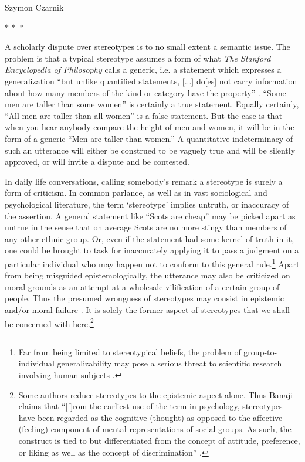 \begin{artengenv}{Szymon Czarnik}
\begin{center}
$ {\ast}\,{\ast}\,{\ast} $
\end{center}


A scholarly dispute over stereotypes is to no small extent a semantic issue. The problem is that a typical stereotype assumes a form of what \textit{The Stanford Encyclopedia of Philosophy} calls a generic, i.e. a statement which expresses a generalization ``but unlike quantified statements, [...] do[es] not carry information about how many members of the kind or category have the property''
\parencite[][]{leslie_generic_2016}. %
 ``Some men are taller than some women'' is certainly a true statement. Equally certainly, ``All men are taller than all women'' is a false statement. But the case is that when you hear anybody compare the height of men and women, it will be in the form of a generic ``Men are taller than women.'' A quantitative indeterminacy of such an utterance will either be construed to be vaguely true and will be silently approved, or will invite a dispute and be contested.

\enlargethispage{.7\baselineskip}
In daily life conversations, calling somebody's remark a stereotype is surely a form of criticism. In common parlance, as well as in vast sociological and psychological literature, the term ‘stereotype' implies untruth, or inaccuracy of the assertion. A general statement like ``Scots are cheap'' may be picked apart as untrue in the sense that on average Scots are no more stingy than members of any other ethnic group. Or, even if the statement had some kernel of truth in it, one could be brought to task for inaccurately applying it to pass a judgment on a particular individual who may happen not to conform to this general rule.\footnote{Far from being limited to stereotypical beliefs, the problem of group-to-individual generalizability may pose a serious threat to scientific research involving human subjects
\parencite[][]{fisher_lack_2018}.%
} Apart from being misguided epistemologically, the utterance may also be criticized on moral grounds as an attempt at a wholesale vilification of a certain group of people. Thus the presumed wrongness of stereotypes may consist in epistemic and/or moral failure 
\parencite[][]{beeghly_seeing_2014}. %
 It is solely the former aspect of stereotypes that we shall be concerned with here.\footnote{Some authors reduce stereotypes to the epistemic aspect alone. Thus Banaji claims that ``[f]rom the earliest use of the term in psychology, stereotypes have been regarded as the cognitive (thought) as opposed to the affective (feeling) component of mental representations of social groups. As such, the construct is tied to but differentiated from the concept of attitude, preference, or liking as well as the concept of discrimination'' 
\parencite[][p.15101]{banaji_stereotypes_2001}. %
 }


\end{artengenv}
